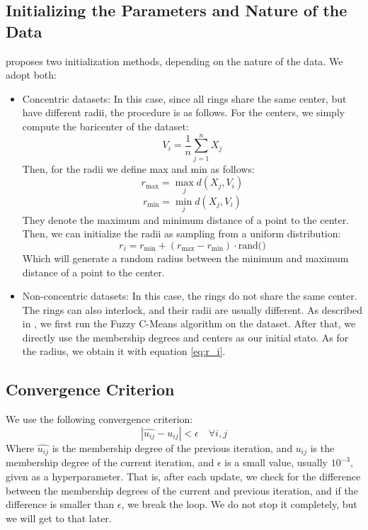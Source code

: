 \documentclass[conference]{IEEEtran}
\begin{document}
\subsection{Initializing the Parameters and Nature of the Data}
\cite{308484} proposes two initialization methods, depending on the nature of the data. We adopt both:
\begin{itemize}
    \item Concentric datasets: In this case, since all rings share the same center, but have different radii, the procedure is as follows.
    For the centers, we simply compute the baricenter of the dataset:
    \begin{equation}
        V_i = \frac{1}{n} \sum_{j=1}^{n} X_j
    \end{equation}
    Then, for the radii we define max and min as follows:
    \begin{equation}
        r_{\text{max}} = \max_{j} d(X_j, V_i)
    \end{equation}
    \begin{equation}
        r_{\text{min}} = \min_{j} d(X_j, V_i)
    \end{equation}
    They denote the maximum and minimum distance of a point to the center. Then, we can initialize the radii as sampling from a uniform distribution:
    \begin{equation}
        r_i = r_{\text{min}} + (r_{\text{max}} - r_{\text{min}}) \cdot \text{rand()}
    \end{equation}
    Which will generate a random radius between the minimum and maximum distance of a point to the center.
    \item Non-concentric datasets: In this case, the rings do not share the same center. The rings can also interlock, and their radii are usually different.
    As described in \cite{308484}, we first run the Fuzzy C-Means algorithm on the dataset. After that, we directly use the membership degrees and centers as our initial
    stato. As for the radius, we obtain it with equation \eqref{eq:r_i}.
\end{itemize}

\subsection{Convergence Criterion}
We use the following convergence criterion:
\begin{equation}
|\hat{u_{ij}} - u_{ij}| < \epsilon \quad \forall i, j
\end{equation}
Where $\hat{u_{ij}}$ is the membership degree of the previous iteration, and $u_{ij}$ is the membership degree of the current iteration,
and $\epsilon$ is a small value, usually $10^{-3}$, given as a hyperparameter.
That is, after each update, we check for the difference between the membership degrees of the current and previous iteration, and if the difference is smaller than $\epsilon$,
we break the loop. We do not stop it completely, but we will get to that later.
\end{document}

